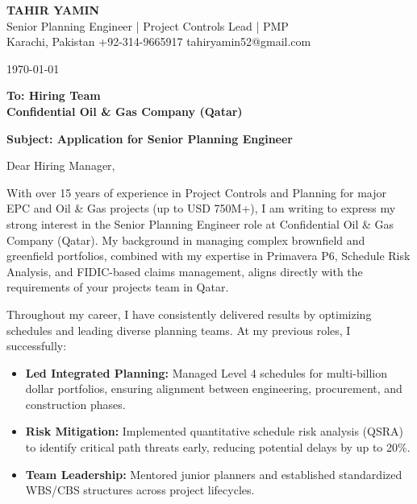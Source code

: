 \documentclass[11pt,a4paper]{article}
\begin{document}
\begin{center}
    {\Huge \textbf{\color{awesome-darknight} TAHIR YAMIN}} \\[0.2cm]
    {\Large \color{awesome-gray} Senior Planning Engineer | Project Controls Lead | PMP} \\[0.3cm]
    
    \small \color{light-gray}
    Karachi, Pakistan \quad \textbullet \quad 
    +92-314-9665917 \quad \textbullet \quad 
    tahiryamin52@gmail.com
\end{center}

\vspace{0.8cm}
\today
\vspace{0.5cm}

\textbf{To: Hiring Team} \\
\textbf{Confidential Oil \& Gas Company (Qatar)} \\
\vspace{0.5cm}

\textbf{Subject: Application for Senior Planning Engineer}

\vspace{0.5cm}

Dear Hiring Manager,

With over 15 years of experience in Project Controls and Planning for major EPC and Oil \& Gas projects (up to USD 750M+), I am writing to express my strong interest in the Senior Planning Engineer role at Confidential Oil \& Gas Company (Qatar). My background in managing complex brownfield and greenfield portfolios, combined with my expertise in Primavera P6, Schedule Risk Analysis, and FIDIC-based claims management, aligns directly with the requirements of your projects team in Qatar.

Throughout my career, I have consistently delivered results by optimizing schedules and leading diverse planning teams. At my previous roles, I successfully:

\begin{itemize}
    \item \textbf{Led Integrated Planning:} Managed Level 4 schedules for multi-billion dollar portfolios, ensuring alignment between engineering, procurement, and construction phases.
    \item \textbf{Risk Mitigation:} Implemented quantitative schedule risk analysis (QSRA) to identify critical path threats early, reducing potential delays by up to 20\%.
    \item \textbf{Team Leadership:} Mentored junior planners and established standardized WBS/CBS structures across project lifecycles.
\end{itemize}
\end{document}
